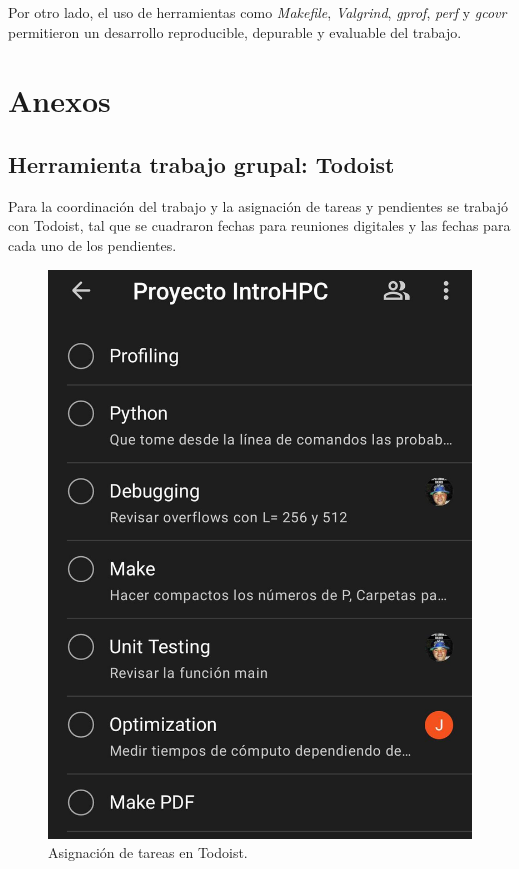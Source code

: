 \documentclass[%
 reprint,
 amsmath,amssymb,
 aps,
]{revtex4-2}
\begin{document}
Por otro lado, el uso de herramientas como \textit{Makefile}, \textit{Valgrind}, \textit{gprof}, \textit{perf} y \textit{gcovr} permitieron un desarrollo reproducible, depurable y evaluable del trabajo.
\vspace{0.2 cm}

\section{Anexos}

\subsection{Herramienta trabajo grupal: Todoist}

Para la coordinación del trabajo y la asignación de tareas y pendientes se trabajó con Todoist, tal que se cuadraron fechas para reuniones digitales y las fechas para cada uno de los pendientes.

\begin{figure}[H]
    \centering
    \includegraphics[width=0.8\linewidth]{todoist.jpeg}
    \caption{Asignación de tareas en Todoist.}
    \label{fig: todoist}
\end{figure}


\end{document}
